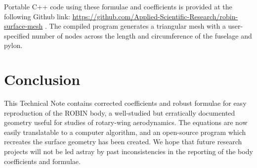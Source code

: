 \documentclass[12pt]{article}
\begin{document}
Portable C++ code using these formulae and coefficients is provided at the following Github link:
\url{https://github.com/Applied-Scientific-Research/robin-surface-mesh} \cite{robinsurfmesh}.
The compiled program generates a triangular mesh with a user-specified number of nodes across
the length and circumference of the fuselage and pylon.


\section{Conclusion}

This Technical Note contains corrected coefficients and robust formulae for
easy reproduction of the ROBIN body, a well-studied but erratically documented
geometry useful for studies of rotary-wing aerodynamics.
The equations are now easily translatable to a computer algorithm, and an
open-source program which recreates the surface geometry has been created.
We hope that future research projects will not be led astray by past 
inconsistencies in the reporting of the body coefficients and formulae.




\end{document}
